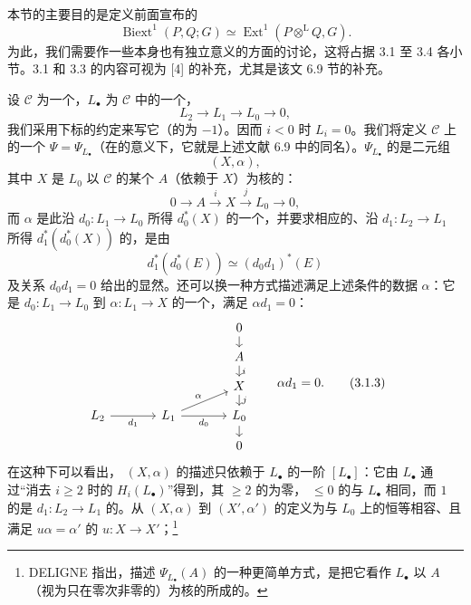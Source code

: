 本节的主要目的是定义前面宣布的
\[
\operatorname{Biext}^{1}(P,Q;G)\simeq\operatorname{Ext}^{1}(P\mathbin{\otimes^{\mathrm L}}Q,G).
\]
为此，我们需要作一些本身也有独立意义的方面的讨论，这将占据 3.1 至 3.4 各小节。3.1 和 3.3 的内容可视为 [4] 的补充，尤其是该文 6.9 节的补充。

设 $\mathcal C$ 为一个，$L_\bullet$ 为 $\mathcal C$ 中的一个，
\[
L_2\longrightarrow L_1\longrightarrow L_0\longrightarrow0,\tag{3.1.1}
\]
我们采用下标的约定来写它（的为 $-1$）。因而 $i<0$ 时 $L_i=0$。我们将定义 $\mathcal C$ 上的一个 $\Psi=\Psi_{L_\bullet}$（在的意义下，它就是上述文献 6.9 中的同名）。$\Psi_{L_\bullet}$ 的是二元组
\[
(X,\alpha),
\]
其中 $X$ 是 $L_0$ 以 $\mathcal C$ 的某个 $A$（依赖于 $X$）为核的：
\[
0\longrightarrow A\xrightarrow{i}X\xrightarrow{j}L_0\longrightarrow0,\tag{3.1.2}
\]
而 $\alpha$ 是此沿 $d_0:L_1\to L_0$ 所得 $d_0^*(X)$ 的一个，并要求相应的、沿 $d_1:L_2\to L_1$ 所得 $d_1^*(d_0^*(X))$ 的，是由
\[
d_1^*(d_0^*(E))\simeq(d_0d_1)^*(E)
\]
及关系 $d_0d_1=0$ 给出的显然。还可以换一种方式描述满足上述条件的数据 $\alpha$：它是 $d_0:L_1\to L_0$ 到 $\alpha:L_1\to X$ 的一个，满足 $\alpha d_1=0$：
\[
\begin{tikzcd}[column sep=large,row sep=small]
&&0\arrow[d]\\
&&A\arrow[d,"i"]\\
&&X\arrow[d,"j"]\\
L_2\arrow[r,"d_1"']&L_1\arrow[r,"d_0"']\arrow[ur,"\alpha"]&L_0\arrow[d]\\
&&0
\end{tikzcd}
\qquad\alpha d_1=0.\tag{3.1.3}
\]
在这种下可以看出， $(X,\alpha)$ 的描述只依赖于 $L_\bullet$ 的一阶 $[L_\bullet]$：它由 $L_\bullet$ 通过“消去 $i\geq2$ 时的 $H_i(L_\bullet)$”得到，其 $\geq2$ 的为零， $\leq0$ 的与 $L_\bullet$ 相同，而 $1$ 的是 $d_1:L_2\to L_1$ 的。从 $(X,\alpha)$ 到 $(X',\alpha')$ 的定义为与 $L_0$ 上的恒等相容、且满足 $u\alpha=\alpha'$ 的 $u:X\to X'$；\footnote{DELIGNE 指出，描述 $\Psi_{L_\bullet}(A)$ 的一种更简单方式，是把它看作 $L_\bullet$ 以 $A$（视为只在零次非零的）为核的所成的。}
